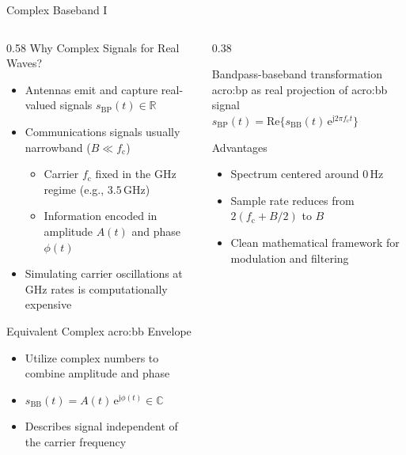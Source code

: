 \begin{frame}{Complex Baseband I}
  \begin{columns}[onlytextwidth]
    \begin{column}{0.58\textwidth}
      Why Complex Signals for Real Waves?\\
      \begin{itemize}
        \item Antennas emit and capture real-valued signals $s_\mathrm{BP}(t) \in \mathbb{R}$
        \item Communications signals usually narrowband ($B \ll f_\mathrm{c}$)
          \begin{itemize}
            \item Carrier $f_\mathrm{c}$ fixed in the GHz regime (e.g., $3.5\,\mathrm{GHz}$)
            \item Information encoded in amplitude $A(t)$ and phase $\phi(t)$
          \end{itemize}
        \item Simulating carrier oscillations at GHz rates is computationally expensive
      \end{itemize}
      \vspace{0.8em}
      Equivalent Complex \gls{acro:bb} Envelope\\
      \begin{itemize}
        \item Utilize complex numbers to combine amplitude and phase
        \item $s_\mathrm{BB}(t) = A(t) \,\mathrm{e}^{\mathrm{j} \phi(t)} \in \mathbb{C}$
        \item Describes signal independent of the carrier frequency
      \end{itemize}
    \end{column}

    \begin{column}{0.38\textwidth}
      \begin{block}{Bandpass-baseband transformation}
        \Gls{acro:bp} as real projection of \gls{acro:bb} signal\\
        \vspace{0.5em}
        \centering
        $s_\mathrm{BP}(t) = \mathrm{Re}\Big\{ s_\mathrm{BB}(t) \,\mathrm{e}^{\mathrm{j} 2\pi f_\mathrm{c} t} \Big\}$
      \end{block}

      \begin{block}{Advantages}
        \begin{itemize}
          \item Spectrum centered around $0\,\mathrm{Hz}$
          \item Sample rate reduces from $2(f_\mathrm{c} + B/2)$ to $B$
          \item Clean mathematical framework for modulation and filtering
        \end{itemize}
      \end{block}
    \end{column}
  \end{columns}
\end{frame}

